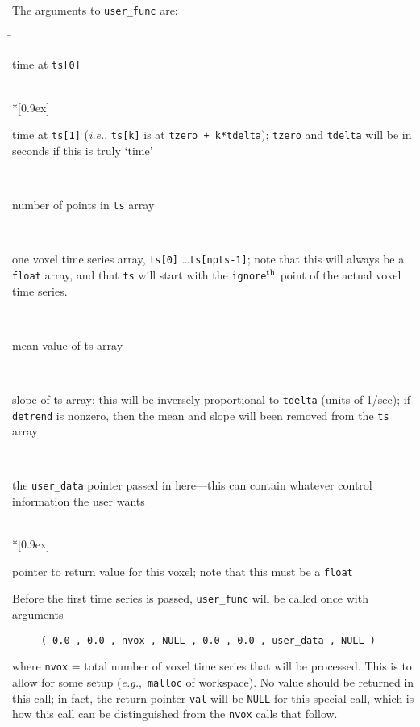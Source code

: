 \vset\noindent
The arguments to {\tt user\_func} are:
\begin{tabbing}
  \hspace*{1in} \= \kill
%
   \> \parbox[t]{5.2in}{time at {\tt ts[0]}} \\*[0.9ex]
%
   \> \parbox[t]{5.2in}{time at {\tt ts[1]} ({\it i.e.}, {\tt ts[k]} is at
                                      {\tt tzero + k*tdelta});
                                      {\tt tzero} and {\tt tdelta} will be in seconds
                                      if this is truly `time'} \\[0.9ex]
%
   \> \parbox[t]{5.2in}{number of points in {\tt ts} array} \\[0.9ex]
%
   \> \parbox[t]{5.2in}{one voxel time series array,
                          {\tt ts[0]} \ldots {\tt ts[npts-1]};
                           note that this will always be a {\tt float} array, and
                           that {\tt ts} will start with the {\tt ignore}$^{\rm th}$ point of
                           the actual voxel time series.} \\[0.9ex]
%
   \> \parbox[t]{5.2in}{mean value of ts array} \\[0.9ex]
%
   \> \parbox[t]{5.2in}{ slope of ts array;
                     this will be inversely proportional to {\tt tdelta}
                     (units of 1/sec);
                     if {\tt detrend} is nonzero, then the mean and slope
                     will been removed from the {\tt ts} array} \\[0.9ex]
%
   \> \parbox[t]{5.2in}{the {\tt user\_data} pointer passed in here---this can
                     contain whatever control information the user wants} \\*[0.9ex]
%
   \> \parbox[t]{5.2in}{pointer to return value for this voxel;
                                 note that this must be a {\tt float}}
\end{tabbing}

\vset
  Before the first time series is passed, {\tt user\_func} will be called once with
  arguments
\begin{verbatim}
     ( 0.0 , 0.0 , nvox , NULL , 0.0 , 0.0 , user_data , NULL )
\end{verbatim}
  where {\tt nvox} = total number of voxel time series that will be processed.
  This is to allow for some setup ({\it e.g.},~{\tt malloc} of workspace).
  No value should be returned in this call; in fact, the return pointer {\tt val}
  will be {\tt NULL} for this special call, which is how this call can be
  distinguished from the {\tt nvox} calls that follow.

